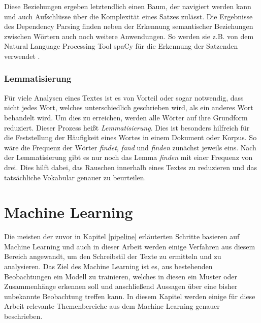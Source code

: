 
Diese Beziehungen ergeben letztendlich einen Baum, der navigiert werden kann und auch Aufschlüsse über die Komplexität eines Satzes zulässt. Die Ergebnisse des Dependency Parsing finden neben der Erkennung semantischer Beziehungen zwischen Wörtern auch noch weitere Anwendungen. So werden sie z.B. von dem Natural Language Processing Tool spaCy für die Erkennung der Satzenden  verwendet \cite{spacyDependencyParsing}.

\subsubsection*{Lemmatisierung}
Für viele Analysen eines Textes ist es von Vorteil oder sogar notwendig, dass nicht jedes Wort, welches unterschiedlich geschrieben wird, als ein anderes Wort behandelt wird. Um dies zu erreichen, werden alle Wörter auf ihre Grundform reduziert. Dieser Prozess heißt \emph{Lemmatisierung}. Dies ist besonders hilfreich für die Feststellung der Häufigkeit eines Wortes in einem Dokument oder Korpus. So wäre die Frequenz der Wörter \textit{findet}, \textit{fand} und \textit{finden} zunächst jeweils eins. Nach der Lemmatisierung gibt es nur noch das Lemma \textit{finden} mit einer Frequenz von drei. Dies hilft dabei, das Rauschen innerhalb eines Textes zu reduzieren und das tatsächliche Vokabular genauer zu beurteilen.

\section{Machine Learning}
Die meisten der zuvor in Kapitel \ref{pipeline} erläuterten Schritte basieren auf Machine Learning und auch in dieser Arbeit werden einige Verfahren aus diesem Bereich angewandt, um den Schreibstil der Texte zu ermitteln und zu analysieren. Das Ziel des Machine Learning ist es, aus bestehenden Beobachtungen ein Modell zu trainieren, welches in diesen ein Muster oder Zusammenhänge erkennen soll und anschließend Aussagen über eine bisher unbekannte Beobachtung treffen kann. In diesem Kapitel werden einige für diese Arbeit relevante Themenbereiche aus dem Machine Learning genauer beschrieben.

